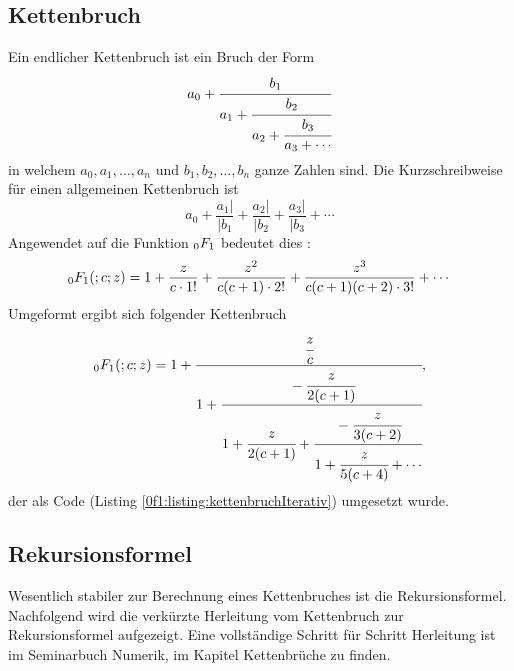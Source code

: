 \subsection{Kettenbruch
\label{0f1:subsection:kettenbruch}}
Ein endlicher Kettenbruch \cite{0f1:wiki-kettenbruch} ist ein Bruch der Form
\begin{equation*}
a_0 + \cfrac{b_1}{a_1+\cfrac{b_2}{a_2+\cfrac{b_3}{a_3+\cdots}}}
\end{equation*}
in welchem $a_0, a_1,\dots,a_n$ und $b_1,b_2,\dots,b_n$ ganze Zahlen sind.
Die Kurzschreibweise für einen allgemeinen Kettenbruch ist 
\begin{equation*}
	a_0 + \frac{a_1|}{|b_1} + \frac{a_2|}{|b_2} + \frac{a_3|}{|b_3} + \cdots
\end{equation*}
Angewendet auf die Funktion $\mathstrut_0F_1$ bedeutet dies \cite{0f1:wiki-fraction}:
\begin{equation*}
	\mathstrut_0F_1(;c;z) = 1 + \frac{z}{c\cdot1!} + \frac{z^2}{c(c+1)\cdot2!} + \frac{z^3}{c(c+1)(c+2)\cdot3!} + \cdots
\end{equation*}
Umgeformt ergibt sich folgender Kettenbruch \cite{0f1:wolfram-0f1}
\begin{equation}
	\label{0f1:math:kettenbruch:0f1:eq}
	\mathstrut_0F_1(;c;z) = 1 + \cfrac{\cfrac{z}{c}}{1+\cfrac{-\cfrac{z}{2(c+1)}}{1+\cfrac{z}{2(c+1)}+\cfrac{-\cfrac{z}{3(c+2)}}{1+\cfrac{z}{5(c+4)} + \cdots}}},
\end{equation}
der als Code (Listing \ref{0f1:listing:kettenbruchIterativ})  umgesetzt wurde. 




\subsection{Rekursionsformel
\label{0f1:subsection:rekursionsformel}}
Wesentlich stabiler zur Berechnung eines Kettenbruches ist die Rekursionsformel. Nachfolgend wird die verkürzte Herleitung vom Kettenbruch zur Rekursionsformel aufgezeigt. Eine vollständige Schritt für Schritt Herleitung ist im Seminarbuch Numerik, im Kapitel Kettenbrüche \cite{0f1:kettenbrueche} zu finden.

